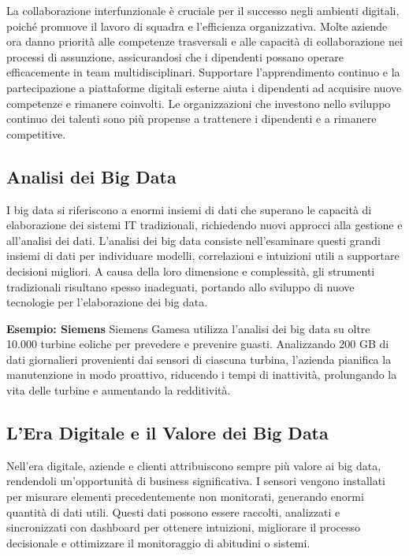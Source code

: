 \documentclass{article}
\begin{document}
La collaborazione interfunzionale è cruciale per il successo negli ambienti digitali, poiché promuove il lavoro di squadra e l'efficienza organizzativa. Molte aziende ora danno priorità alle competenze trasversali e alle capacità di collaborazione nei processi di assunzione, assicurandosi che i dipendenti possano operare efficacemente in team multidisciplinari. Supportare l'apprendimento continuo e la partecipazione a piattaforme digitali esterne aiuta i dipendenti ad acquisire nuove competenze e rimanere coinvolti. Le organizzazioni che investono nello sviluppo continuo dei talenti sono più propense a trattenere i dipendenti e a rimanere competitive.


\subsection{Analisi dei Big Data}

I big data si riferiscono a enormi insiemi di dati che superano le capacità di elaborazione dei sistemi IT tradizionali, richiedendo nuovi approcci alla gestione e all'analisi dei dati. L'analisi dei big data consiste nell'esaminare questi grandi insiemi di dati per individuare modelli, correlazioni e intuizioni utili a supportare decisioni migliori. A causa della loro dimensione e complessità, gli strumenti tradizionali risultano spesso inadeguati, portando allo sviluppo di nuove tecnologie per l'elaborazione dei big data.

\textbf{Esempio: Siemens}
Siemens Gamesa utilizza l'analisi dei big data su oltre 10.000 turbine eoliche per prevedere e prevenire guasti. Analizzando 200 GB di dati giornalieri provenienti dai sensori di ciascuna turbina, l'azienda pianifica la manutenzione in modo proattivo, riducendo i tempi di inattività, prolungando la vita delle turbine e aumentando la redditività.

\subsection{L'Era Digitale e il Valore dei Big Data}
Nell'era digitale, aziende e clienti attribuiscono sempre più valore ai big data, rendendoli un'opportunità di business significativa. I sensori vengono installati per misurare elementi precedentemente non monitorati, generando enormi quantità di dati utili. Questi dati possono essere raccolti, analizzati e sincronizzati con dashboard per ottenere intuizioni, migliorare il processo decisionale e ottimizzare il monitoraggio di abitudini o sistemi.
\end{document}
